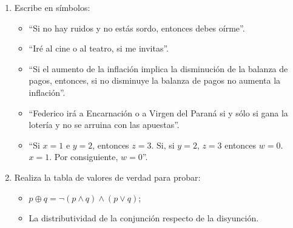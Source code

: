 \begin{enumerate}[label=\textbf{\arabic*}.]
	\item Escribe en símbolos:
	\begin{itemize}
		\item ``Si no hay ruidos y no estás sordo, entonces debes oírme''.
		\item ``Iré al cine o al teatro, si me invitas''.
		\item ``Si el aumento de la inflación implica la disminución de la balanza de pagos, entonces, 
		si no disminuye la balanza de pagos no aumenta la inflación''.
		\item ``Federico irá a Encarnación o a Virgen del Paraná si y sólo si gana la lotería y no se 
		arruina con las apuestas''.
		\item ``Si $x = 1$ e $y = 2$, entonces $z = 3$. Si, si $y = 2$, $z = 3$ entonces $w = 0$. $x = 1$. Por consiguiente, $w = 0$''.
	\end{itemize}
	\item Realiza la tabla de valores de verdad para probar:
	\begin{itemize}
		\item $p \oplus q = \neg (p \land q) \land (p \lor q)$;
		\item La distributividad de la conjunción respecto de la disyunción.
	\end{itemize}
\end{enumerate}